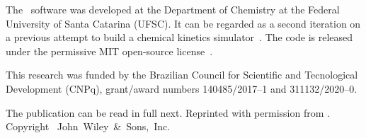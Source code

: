 The \overreact{}~software was developed at the Department of Chemistry at the Federal University of Santa Catarina (UFSC).
It can be regarded as a second iteration on a previous attempt to build a chemical kinetics simulator~\cite{pyrrole2019zenodo}.
The code is released under the permissive MIT open-source license~\cite{MITLicense}.

This research was funded by the Brazilian Council for Scientific and Tecnological Development (CNPq),
grant/award numbers 140485/2017--1 and 311132/2020--0.

The publication can be read in full next.
Reprinted with permission from
.
Copyright~\citeyear{Schneider_2022}
John~Wiley~\&~Sons,~Inc.


